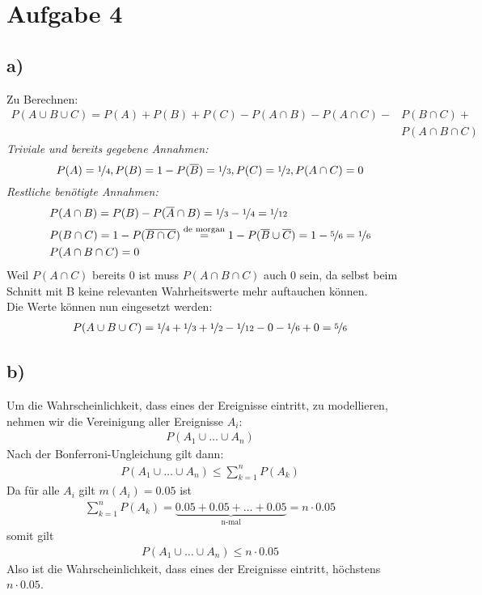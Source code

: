 \pagebreak
\section*{Aufgabe 4}
\subsection*{a)}
Zu Berechnen:
\begin{align*}
  P(A\cup B\cup C) = P(A)+P(B)+P(C)-P(A\cap B)-P(A\cap C)-&P(B\cap C)+\\
  &P(A\cap B\cap C)
\end{align*}
\emph{Triviale und bereits gegebene Annahmen:}\\
$$P(A) = \nicefrac{1}{4},P(B) = 1-P(\overline{B}) = \nicefrac{1}{3},P(C)=\nicefrac{1}{2},P(A\cap C)=0$$
\emph{Restliche benötigte Annahmen:}\\
\begin{align*}
  &P(A\cap B) = P(B) - P(\overline{A}\cap B) = \nicefrac{1}{3} - \nicefrac{1}{4} = \nicefrac{1}{12}\\
  &P(B\cap C) = 1 - P(\overline{B\cap C})\overset{\text{de morgan}}{=} 1 - P(\overline{B}\cup\overline{C}) = 1 - \nicefrac{5}{6} = \nicefrac{1}{6}\\
  &P(A\cap B\cap C) = 0
\end{align*}
Weil $ P(A\cap C) $ bereits 0 ist muss $ P(A\cap B\cap C) $ auch 0 sein, da selbst beim Schnitt mit B keine relevanten Wahrheitswerte mehr auftauchen können. \\
Die Werte können nun eingesetzt werden:
\begin{align*}
  P(A\cup B\cup C) = \nicefrac{1}{4} + \nicefrac{1}{3} + \nicefrac{1}{2} - \nicefrac{1}{12} - 0 - \nicefrac{1}{6} + 0 = \nicefrac{5}{6}
\end{align*}
\subsection*{b)}
Um die Wahrscheinlichkeit, dass eines der Ereignisse eintritt, zu modellieren, nehmen wir die Vereinigung aller Ereignisse $ A_i $:
\begin{align*}
P(A_1\cup\dots\cup A_n)
\end{align*}
Nach der Bonferroni-Ungleichung gilt dann:
\begin{align*}
  P(A_1\cup\dots\cup A_n) \le \sum_{k=1}^{n}P(A_k)
\end{align*}
Da für alle $ A_i $ gilt $ m(A_i)=0.05 $ ist
\begin{align*}
  \sum_{k=1}^{n}P(A_k) = \underbrace{0.05 + 0.05 + \ldots + 0.05}_{\text{n-mal}} = n\cdot 0.05
\end{align*}
somit gilt
\begin{align*}
  P(A_1\cup\dots\cup A_n) \le n\cdot 0.05
\end{align*}
Also ist die Wahrscheinlichkeit, dass eines der Ereignisse eintritt, höchstens $ n\cdot 0.05 $.